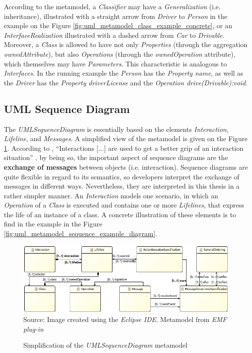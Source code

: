 \documentclass[tuberlin,cic,tc,english,noabntcite, oneside]{iiufrgs}
\begin{document}
According to the metamodel, a \emph{Classifier} may have a \emph{Generalization} (i.e. inheritance), illustrated with a straight arrow from \emph{Driver} to \emph{Person} in the example on the Figure \ref{fig:uml_metamodel_class_example_concrete}, or an \emph{InterfaceRealization}  illustrated with a dashed arrow from \emph{Car} to \emph{Drivable}. Moreover, a \emph{Class} is allowed to have not only \emph{Properties} (through the aggregation \emph{ownedAttribute}), but also \emph{Operations} (through the \emph{ownedOperation} attribute), which themselves may have \emph{Parameters}. This characteristic is analogous to \emph{Interfaces}. In the running example the \emph{Person} has the \emph{Property name}, as well as the \emph{Driver} has the \emph{Property driverLicense} and the \emph{Operation drive(Drivable):void}. 

\subsection{UML Sequence Diagram}
The \emph{UMLSequenceDiagram} is essentially based on the elements \emph{Interaction}, \emph{Lifeline}, and \emph{Messages}. A simplified view of the metamodel is given on the Figure \ref{fig:uml_metamodel_sequence}. According to \citet[p. 563]{omg2007unified}, \enquote{Interactions [...] are used to get a better grip of an interaction situation} \citep[p. 563]{omg2007unified}, by being so, the important aspect of sequence diagrams are the \textbf{exchange of messages} between objects (i.e. interaction). Sequence diagrams are quite flexible in regard to its semantics, so developers interpret the exchange of messages in different ways. Nevertheless, they are interpreted in this thesis in a rather simpler manner. An \emph{Interaction} models one scenario, in which an \emph{Operation} of a \emph{Class} is executed and contains one or more \emph{Lifelines}, that express the life of an instance of a class. A concrete illustration of these elements is to find in the example in the Figure \ref{fig:uml_metamodel_sequence_example_diagram}.

\begin{figure}[H]
	\centering
    \caption{Simplification of the \emph{UMLSequenceDiagram} metamodel}
    \includegraphics[width=\textwidth]{umlSequenceDiagramSimple01} \\
    Source: Image created using the \emph{Eclipse IDE}. Metamodel from \emph{EMF plug-in}
    \label{fig:uml_metamodel_sequence}
\end{figure}
\end{document}
